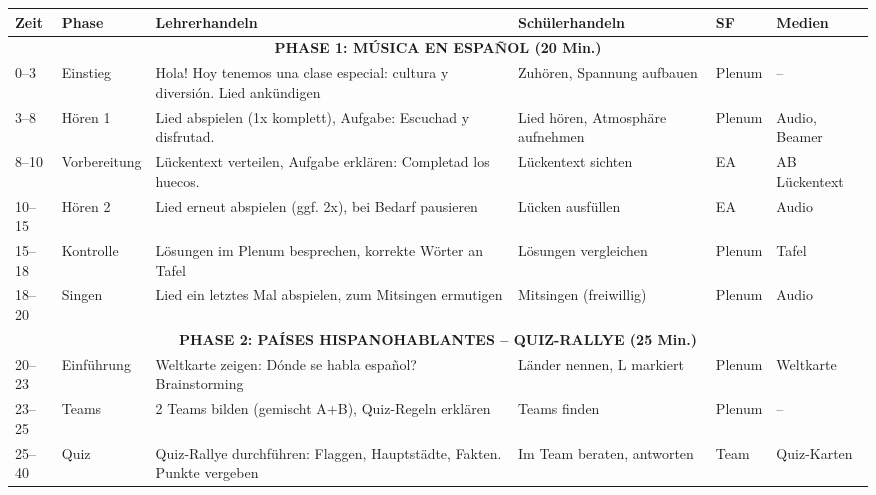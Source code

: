 \documentclass[11pt,a4paper]{article}
\begin{document}
\begin{longtable}{|p{0.8cm}|p{1.5cm}|p{4cm}|p{3cm}|p{1.5cm}|p{2cm}|}
\hline
\textbf{Zeit} & \textbf{Phase} & \textbf{Lehrerhandeln} & \textbf{Schülerhandeln} & \textbf{SF} & \textbf{Medien} \\
\hline
\endhead

\multicolumn{6}{|c|}{\textbf{PHASE 1: MÚSICA EN ESPAÑOL (20 Min.)}} \\
\hline

0--3 & Einstieg & \glqq{}\textexclamdown{}Hola! Hoy tenemos una clase especial: cultura y diversión.\grqq{} Lied ankündigen & Zuhören, Spannung aufbauen & Plenum & -- \\
\hline

3--8 & Hören 1 & Lied abspielen (1x komplett), Aufgabe: \glqq{}Escuchad y disfrutad.\grqq{} & Lied hören, Atmosphäre aufnehmen & Plenum & Audio, Beamer \\
\hline

8--10 & Vorbereitung & Lückentext verteilen, Aufgabe erklären: \glqq{}Completad los huecos.\grqq{} & Lückentext sichten & EA & AB Lückentext \\
\hline

10--15 & Hören 2 & Lied erneut abspielen (ggf. 2x), bei Bedarf pausieren & Lücken ausfüllen & EA & Audio \\
\hline

15--18 & Kontrolle & Lösungen im Plenum besprechen, korrekte Wörter an Tafel & Lösungen vergleichen & Plenum & Tafel \\
\hline

18--20 & Singen & Lied ein letztes Mal abspielen, zum Mitsingen ermutigen & Mitsingen (freiwillig) & Plenum & Audio \\
\hline

\multicolumn{6}{|c|}{\textbf{PHASE 2: PAÍSES HISPANOHABLANTES -- QUIZ-RALLYE (25 Min.)}} \\
\hline

20--23 & Einführung & Weltkarte zeigen: \glqq{}\textquestiondown{}Dónde se habla español?\grqq{} Brainstorming & Länder nennen, L markiert & Plenum & Weltkarte \\
\hline

23--25 & Teams & 2 Teams bilden (gemischt A+B), Quiz-Regeln erklären & Teams finden & Plenum & -- \\
\hline

25--40 & Quiz & Quiz-Rallye durchführen: Flaggen, Hauptstädte, Fakten. Punkte vergeben & Im Team beraten, antworten & Team & Quiz-Karten \\
\hline


\end{longtable}
\end{document}

